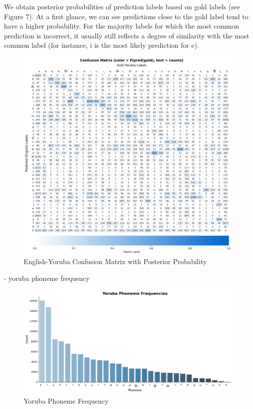 \documentclass[11pt]{article}
\begin{document}
{We obtain posterior probabilities of prediction labels based on gold labels (see Figure 7). At a first glance, we can see predictions close to the gold label tend to have a higher probability. For the majority labels for which the most common prediction is incorrect, it usually still reflects a degree of similarity with the most common label (for instance, i is the most likely prediction for e). 

\begin{figure}
    \centering
    \includegraphics[width=1\linewidth]{EngYorConfusionMatrix.png}
    \caption{English-Yoruba Confusion Matrix with Posterior Probability}
    \label{fig:placeholder}
\end{figure}

- yoruba phoneme frequency
\begin{figure}
    \centering
 \includegraphics[width=1\linewidth]{YorPhonemeFrequency.png}
    \caption{Yoruba Phoneme Frequency}
    \label{fig:placeholder}
\end{figure}



}
\end{document}
